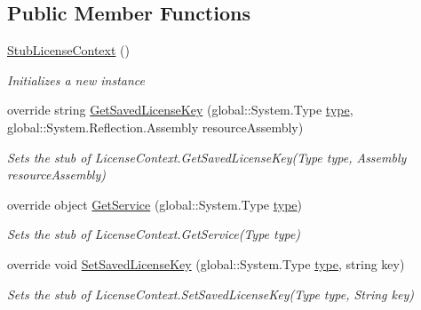 \subsection*{Public Member Functions}
\begin{DoxyCompactItemize}
\item 
\hyperlink{class_system_1_1_component_model_1_1_fakes_1_1_stub_license_context_addf8a6f843fb08293fbf1eaaa70a9c49}{Stub\-License\-Context} ()
\begin{DoxyCompactList}\small\item\em Initializes a new instance\end{DoxyCompactList}\item 
override string \hyperlink{class_system_1_1_component_model_1_1_fakes_1_1_stub_license_context_a679a97befdb1f6ee3fc1e65ac98e1f67}{Get\-Saved\-License\-Key} (global\-::\-System.\-Type \hyperlink{jquery-1_810_82-vsdoc_8js_a3940565e83a9bfd10d95ffd27536da91}{type}, global\-::\-System.\-Reflection.\-Assembly resource\-Assembly)
\begin{DoxyCompactList}\small\item\em Sets the stub of License\-Context.\-Get\-Saved\-License\-Key(\-Type type, Assembly resource\-Assembly)\end{DoxyCompactList}\item 
override object \hyperlink{class_system_1_1_component_model_1_1_fakes_1_1_stub_license_context_afa310beb856d25ec849bb2ca90bf6618}{Get\-Service} (global\-::\-System.\-Type \hyperlink{jquery-1_810_82-vsdoc_8js_a3940565e83a9bfd10d95ffd27536da91}{type})
\begin{DoxyCompactList}\small\item\em Sets the stub of License\-Context.\-Get\-Service(\-Type type)\end{DoxyCompactList}\item 
override void \hyperlink{class_system_1_1_component_model_1_1_fakes_1_1_stub_license_context_a307ada487b584a1e1620691d1a3204d0}{Set\-Saved\-License\-Key} (global\-::\-System.\-Type \hyperlink{jquery-1_810_82-vsdoc_8js_a3940565e83a9bfd10d95ffd27536da91}{type}, string key)
\begin{DoxyCompactList}\small\item\em Sets the stub of License\-Context.\-Set\-Saved\-License\-Key(\-Type type, String key)\end{DoxyCompactList}\end{DoxyCompactItemize}

